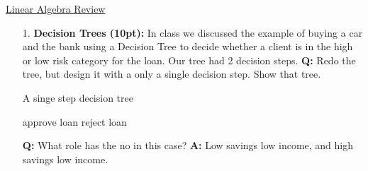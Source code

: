 \documentclass[main.tex]{subfiles}
\begin{document}
\href{https://www2.seas.gwu.edu/~simhaweb/quantum/modules/review/lin-review/lin-review.html}{Linear Algebra Review}

\begin{enumerate}

\item[1.] \textbf{Decision Trees (10pt):} In class we discussed the example of buying a car and the bank using a Decision Tree to decide whether a client is in the high or low risk category for the loan. Our tree had 2 decision steps. \textbf{Q:} Redo the tree, but design it with a only a single decision step. Show that tree. 

\begin{algorithm}
\caption{A singe step decision tree}
\begin{algorithmic}[1]
    \State approve loan
\Else
    \State reject loan
\end{algorithmic}
\end{algorithm}

\textbf{Q:} What role has the no in this case? \textbf{A:} Low savings low income, and high savings low income.

\end{enumerate}
\end{document}
